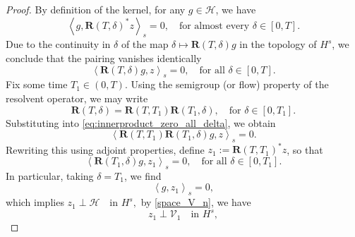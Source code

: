 \documentclass[10pt, reqno]{amsart}
\numberwithin{equation}{section}
\begin{document}
\begin{proof}
By definition of the kernel, for any \( g \in \mathcal{H} \), we have
\[
\left\langle g, \mathbf{R}(T, \delta)^* z \right\rangle_s = 0, \quad \text{for almost every } \delta \in [0, T].
\]
Due to the continuity in \( \delta \) of the map \( \delta \mapsto \mathbf{R}(T, \delta)g \) in the topology of \( H^s \), we conclude that the pairing vanishes identically
\begin{equation} \label{eq:innerproduct_zero_all_delta}
	\left\langle \mathbf{R}(T, \delta)g, z \right\rangle_s = 0, \quad \text{for all } \delta \in [0, T].
\end{equation}
Fix some time \( T_1 \in (0, T) \). Using the semigroup (or flow) property of the resolvent operator, we may write
\[
\mathbf{R}(T, \delta) = \mathbf{R}(T, T_1)\mathbf{R}(T_1, \delta), \quad \text{for } \delta \in [0, T_1].
\]
Substituting into \eqref{eq:innerproduct_zero_all_delta}, we obtain
\[
\left\langle \mathbf{R}(T, T_1)\mathbf{R}(T_1, \delta)g, z \right\rangle_s = 0.
\]
Rewriting this using adjoint properties, define \( z_1 := \mathbf{R}(T, T_1)^* z \), so that
\begin{equation} \label{eq:T1_delta_innerproduct}
	\left\langle \mathbf{R}(T_1, \delta)g, z_1 \right\rangle_s = 0, \quad \text{for all } \delta \in [0, T_1].
\end{equation}
In particular, taking \( \delta = T_1 \), we find
\[
\left\langle g, z_1 \right\rangle_s = 0,
\]
which implies $z_1 \perp \mathcal{H} \quad \text{in } H^s,$
by \eqref{space_V_n}, we have
\begin{equation} \label{eq:z1_orthogonal_H1}
	z_1 \perp \mathcal{V}_1 \quad \text{in } H^s,
\end{equation}


\end{proof}
\end{document}
